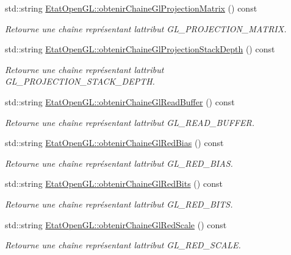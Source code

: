 \begin{DoxyCompactItemize}
std\+::string \hyperlink{group__utilitaire_ga4e56c1c62378ae9385db874bf2b6a030}{Etat\+Open\+G\+L\+::obtenir\+Chaine\+Gl\+Projection\+Matrix} () const 
\begin{DoxyCompactList}\small\item\em Retourne une chaîne représentant l\textquotesingle{}attribut G\+L\+\_\+\+P\+R\+O\+J\+E\+C\+T\+I\+O\+N\+\_\+\+M\+A\+T\+R\+I\+X. \end{DoxyCompactList}\item 
std\+::string \hyperlink{group__utilitaire_gad2d5e19c001663ff2943c43cc9b0c0ea}{Etat\+Open\+G\+L\+::obtenir\+Chaine\+Gl\+Projection\+Stack\+Depth} () const 
\begin{DoxyCompactList}\small\item\em Retourne une chaîne représentant l\textquotesingle{}attribut G\+L\+\_\+\+P\+R\+O\+J\+E\+C\+T\+I\+O\+N\+\_\+\+S\+T\+A\+C\+K\+\_\+\+D\+E\+P\+T\+H. \end{DoxyCompactList}\item 
std\+::string \hyperlink{group__utilitaire_ga5d3a759c6f7b623d7598708ca4810b00}{Etat\+Open\+G\+L\+::obtenir\+Chaine\+Gl\+Read\+Buffer} () const 
\begin{DoxyCompactList}\small\item\em Retourne une chaîne représentant l\textquotesingle{}attribut G\+L\+\_\+\+R\+E\+A\+D\+\_\+\+B\+U\+F\+F\+E\+R. \end{DoxyCompactList}\item 
std\+::string \hyperlink{group__utilitaire_ga4db73eaaf942ff5c5aa9b62e0386f9a9}{Etat\+Open\+G\+L\+::obtenir\+Chaine\+Gl\+Red\+Bias} () const 
\begin{DoxyCompactList}\small\item\em Retourne une chaîne représentant l\textquotesingle{}attribut G\+L\+\_\+\+R\+E\+D\+\_\+\+B\+I\+A\+S. \end{DoxyCompactList}\item 
std\+::string \hyperlink{group__utilitaire_gac4060a4139d031b9f8b9b1198c4a89f5}{Etat\+Open\+G\+L\+::obtenir\+Chaine\+Gl\+Red\+Bits} () const 
\begin{DoxyCompactList}\small\item\em Retourne une chaîne représentant l\textquotesingle{}attribut G\+L\+\_\+\+R\+E\+D\+\_\+\+B\+I\+T\+S. \end{DoxyCompactList}\item 
std\+::string \hyperlink{group__utilitaire_gae20713f3668cb6be662849b8de30d623}{Etat\+Open\+G\+L\+::obtenir\+Chaine\+Gl\+Red\+Scale} () const 
\begin{DoxyCompactList}\small\item\em Retourne une chaîne représentant l\textquotesingle{}attribut G\+L\+\_\+\+R\+E\+D\+\_\+\+S\+C\+A\+L\+E. \end{DoxyCompactList}\item 

\end{DoxyCompactItemize}
